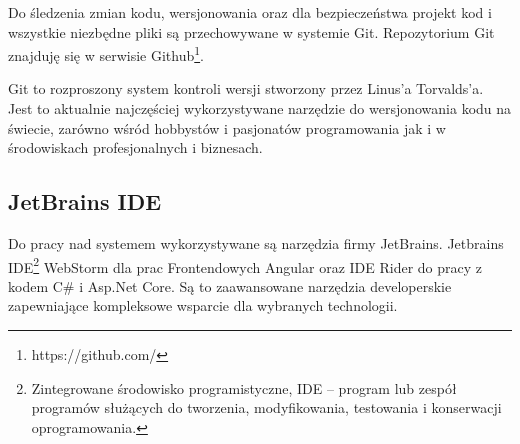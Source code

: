 Do śledzenia zmian kodu, wersjonowania oraz dla bezpieczeństwa projekt kod i wszystkie niezbędne pliki są przechowywane w systemie Git. Repozytorium Git znajduję się w serwisie Github\footnote{https://github.com/}.

Git to rozproszony system kontroli wersji stworzony przez Linus'a Torvalds'a. Jest to aktualnie najczęściej wykorzystywane narzędzie do wersjonowania kodu na świecie, zarówno wśród hobbystów i pasjonatów programowania jak i w środowiskach profesjonalnych i biznesach.

\subsection{JetBrains IDE}

Do pracy nad systemem wykorzystywane są narzędzia firmy JetBrains. Jetbrains IDE\footnote{Zintegrowane środowisko programistyczne, IDE – program lub zespół programów służących do tworzenia, modyfikowania, testowania i konserwacji oprogramowania.\cite{wikipedia.pl}} WebStorm dla prac Frontendowych Angular oraz IDE Rider do pracy z kodem C# i Asp.Net Core. Są to zaawansowane narzędzia developerskie zapewniające kompleksowe wsparcie dla wybranych technologii.